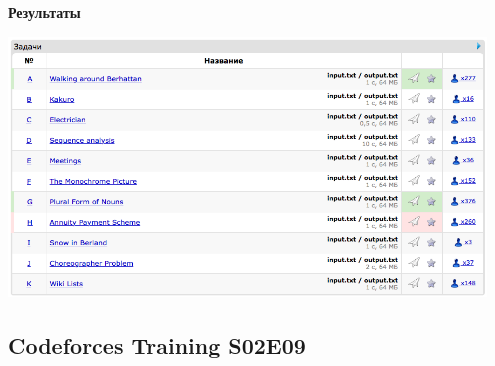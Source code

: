 \documentclass[a4paper,12pt]{article}
\begin{document}
\textbf{{\large Результаты}} \\
\begin{center}
\includegraphics[width=0.95\textwidth]{CT_S02E05/CT_S02E05_result.png}\\ [1cm]
\end{center}



%
%
\newpage
\subsection{Codeforces Training S02E09}
\end{document}
